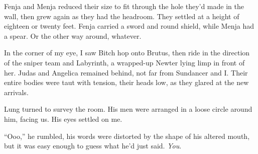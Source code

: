 Fenja and Menja reduced their size to fit through the hole they'd made in the wall, then grew again as they had the headroom.  They settled at a height of eighteen or twenty feet.  Fenja carried a sword and round shield, while Menja had a spear.  Or the other way around, whatever.



In the corner of my eye, I saw Bitch hop onto Brutus, then ride in the direction of the sniper team and Labyrinth, a wrapped-up Newter lying limp in front of her.  Judas and Angelica remained behind, not far from Sundancer and I.  Their entire bodies were taut with tension, their heads low, as they glared at the new arrivals.



Lung turned to survey the room.  His men were arranged in a loose circle around him, facing us.  His eyes settled on me.



``Ooo,'' he rumbled, his words were distorted by the shape of his altered mouth, but it was easy enough to guess what he'd just said.  \emph{You}.





